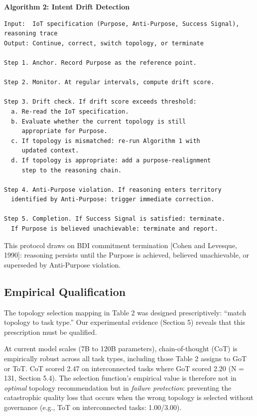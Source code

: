 \documentclass[11pt,a4paper]{article}
\begin{document}
\textbf{Algorithm 2: Intent Drift Detection}

\begin{verbatim}
Input:  IoT specification (Purpose, Anti-Purpose, Success Signal), reasoning trace
Output: Continue, correct, switch topology, or terminate

Step 1. Anchor. Record Purpose as the reference point.

Step 2. Monitor. At regular intervals, compute drift score.

Step 3. Drift check. If drift score exceeds threshold:
  a. Re-read the IoT specification.
  b. Evaluate whether the current topology is still
     appropriate for Purpose.
  c. If topology is mismatched: re-run Algorithm 1 with
     updated context.
  d. If topology is appropriate: add a purpose-realignment
     step to the reasoning chain.

Step 4. Anti-Purpose violation. If reasoning enters territory
  identified by Anti-Purpose: trigger immediate correction.

Step 5. Completion. If Success Signal is satisfied: terminate.
  If Purpose is believed unachievable: terminate and report.
\end{verbatim}

This protocol draws on BDI commitment termination {[}Cohen and Levesque,
1990{]}: reasoning persists until the Purpose is achieved, believed
unachievable, or superseded by Anti-Purpose violation.

\subsection{Empirical Qualification}\label{empirical-qualification}

The topology selection mapping in Table 2 was designed prescriptively:
``match topology to task type.'' Our experimental evidence (Section 5)
reveals that this prescription must be qualified.

At current model scales (7B to 120B parameters), chain-of-thought (CoT)
is empirically robust across all task types, including those Table 2
assigns to GoT or ToT. CoT scored 2.47 on interconnected tasks where GoT
scored 2.20 (N = 131, Section 5.4). The selection function's empirical
value is therefore not in \emph{optimal} topology recommendation but in
\emph{failure protection}: preventing the catastrophic quality loss that
occurs when the wrong topology is selected without governance (e.g., ToT
on interconnected tasks: 1.00/3.00).
\end{document}
